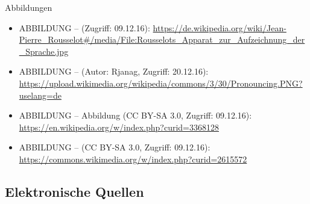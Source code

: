 \begin{frame}[allowframebreaks]{Abbildungen}
	\footnotesize
		
		\begin{itemize}
			\item ABBILDUNG --  (Zugriff: 09.12.16): \url{https://de.wikipedia.org/wiki/Jean-Pierre\_Rousselot\#/media/File:Rousselots\_Apparat\_zur\_Aufzeichnung\_der\_Sprache.jpg}

			\item ABBILDUNG --  (Autor: Rjanag, Zugriff: 20.12.16): \url{https://upload.wikimedia.org/wikipedia/commons/3/30/Pronouncing.PNG?uselang=de}

			\item ABBILDUNG -- Abbildung  (CC BY-SA 3.0, Zugriff: 09.12.16): \url{https://en.wikipedia.org/w/index.php?curid=3368128}

			\item ABBILDUNG --  (CC BY-SA 3.0, Zugriff: 09.12.16): \url{https://commons.wikimedia.org/w/index.php?curid=2615572}
		\end{itemize}	
	
\end{frame}


\subsection*{Elektronische Quellen}

